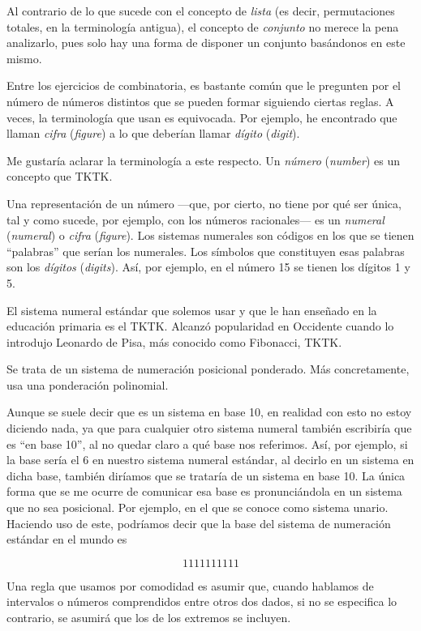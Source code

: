 Al contrario de lo que sucede con el concepto de \emph{lista} (es decir,
permutaciones totales, en la terminología antigua), el concepto de
\emph{conjunto} no merece la pena analizarlo, pues solo hay una forma de
disponer un conjunto basándonos en este mismo.







Entre los ejercicios de combinatoria, es bastante común que le pregunten por
el número de números distintos que se pueden formar siguiendo ciertas
reglas. A veces, la terminología que usan es equivocada. Por ejemplo, he
encontrado que llaman \emph{cifra} (\emph{figure}) a lo que deberían llamar \emph{dígito}
(\emph{digit}).

Me gustaría aclarar la terminología a este respecto. Un \emph{número}
(\emph{number}) es un concepto que TKTK.

Una representación de un número ---que, por cierto, no tiene por qué ser
única, tal y como sucede, por ejemplo, con los números racionales--- es un
\emph{numeral} (\emph{numeral}) o \emph{cifra} (\emph{figure}). Los sistemas
numerales son códigos en los que se tienen ``palabras'' que serían los
numerales. Los símbolos que constituyen esas palabras son los \emph{dígitos}
(\emph{digits}). Así, por ejemplo, en el número 15 se tienen los dígitos 1 y
5.

El sistema numeral estándar que solemos usar y que le han enseñado en la
educación primaria es el TKTK. Alcanzó popularidad en Occidente cuando lo
introdujo Leonardo de Pisa, más conocido como Fibonacci, TKTK.

Se trata de un sistema de numeración posicional ponderado. Más
concretamente, usa una ponderación polinomial.

Aunque se suele decir que es un sistema en base 10, en realidad con esto no
estoy diciendo nada, ya que para cualquier otro sistema numeral también
escribiría que es ``en base 10'', al no quedar claro a qué base nos
referimos. Así, por ejemplo, si la base sería el 6 en nuestro sistema
numeral estándar, al decirlo en un sistema en dicha base, también diríamos
que se trataría de un sistema en base 10. La única forma que se me ocurre de
comunicar esa base es pronunciándola en un sistema que no sea posicional.
Por ejemplo, en el que se conoce como sistema unario. Haciendo uso de este,
podríamos decir que la base del sistema de numeración estándar en el mundo
es

$$ 1111111111 $$







Una regla que usamos por comodidad es asumir que, cuando hablamos de
intervalos o números comprendidos entre otros dos dados, si no se especifica
lo contrario, se asumirá que los de los extremos se incluyen.








